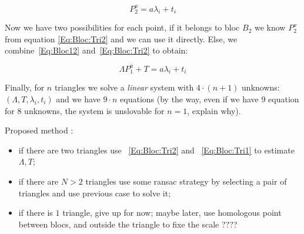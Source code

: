 \begin{equation}
	P^a_2    = a \lambda_i + t_i     \label{Eq:Bloc:Tri2}
\end{equation}

Now we have two possibilities for each point, if it belongs to bloc $B_2$ we know $P^x_2$ from equation
\ref{Eq:Bloc:Tri2} and we can use it directly. Else, we combine~\ref{Eq:Bloc12} and~\ref{Eq:Bloc:Tri2}
to obtain:

\begin{equation}
	 \Lambda P^a_1 + T = a \lambda_i + t_i \label{Eq:Bloc:Tri1}
\end{equation}

Finally, for  $n$ triangles we solve a \emph{linear} system with $4\cdot(n+1)$ unknowns:
$(\Lambda,T,\lambda_i,t_i)$ and we have $9\cdot n$ equations (by the way, even if we have 
$9$ equation for $8$ unknowns, the system is unslovable for $n=1$, explain why).

Proposed method :

\begin{itemize}
    \item if there are two triangles use ~\ref{Eq:Bloc:Tri2} and ~\ref{Eq:Bloc:Tri1}
          to estimate $\Lambda,T$;

    \item if there are $N>2$ triangles use some ransac strategy by selecting a pair of triangles
          and use previous case to solve it;

     \item if there is $1$ triangle, give up for now;  maybe later, use homologous point between
	     blocs, and outside the triangle to fixe the scale ????

\end{itemize}







